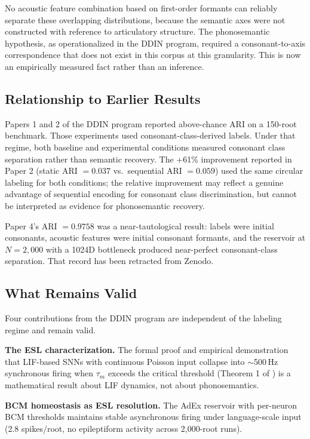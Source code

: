 \documentclass{article}
\begin{document}
No acoustic feature combination based on first-order formants can
reliably separate these overlapping distributions, because the semantic
axes were not constructed with reference to articulatory structure. The
phonosemantic hypothesis, as operationalized in the DDIN program, required
a consonant-to-axis correspondence that does not exist in this corpus at
this granularity. This is now an empirically measured fact rather than
an inference.

\subsection{Relationship to Earlier Results}

Papers 1 and 2 of the DDIN program reported above-chance ARI on a
150-root benchmark. Those experiments used consonant-class-derived labels.
Under that regime, both baseline and experimental conditions measured
consonant class separation rather than semantic recovery. The +61\%
improvement reported in Paper 2 (static ARI $= 0.037$ vs.\ sequential
ARI $= 0.059$) used the same circular labeling for both conditions; the
relative improvement may reflect a genuine advantage of sequential
encoding for consonant class discrimination, but cannot be interpreted
as evidence for phonosemantic recovery.

Paper 4's ARI $= 0.9758$ was a near-tautological result: labels were
initial consonants, acoustic features were initial consonant formants,
and the reservoir at $N = 2{,}000$ with a 1024D bottleneck produced
near-perfect consonant-class separation. That record has been retracted
from Zenodo.

\subsection{What Remains Valid}

Four contributions from the DDIN program are independent of the labeling
regime and remain valid.

\textbf{The ESL characterization.} The formal proof and empirical
demonstration that LIF-based SNNs with continuous Poisson input collapse
into $\sim$500\,Hz synchronous firing when $\tau_m$ exceeds the critical
threshold (Theorem 1 of \citet{kumar2026esl}) is a mathematical result
about LIF dynamics, not about phonosemantics.

\textbf{BCM homeostasis as ESL resolution.} The AdEx reservoir with
per-neuron BCM thresholds maintains stable asynchronous firing under
language-scale input (2.8 spikes/root, no epileptiform activity across
2,000-root runs).
\end{document}
